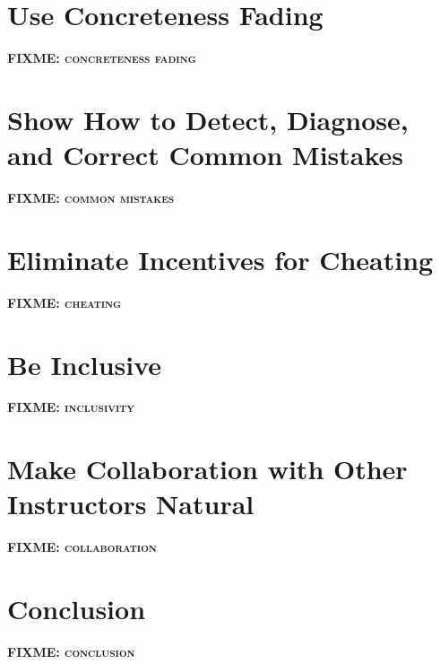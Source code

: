 \documentclass[10pt,letterpaper]{article}
\newcommand{\fixme}[1]{\textsc{\textbf{FIXME: {#1}}}}
\newcommand{\rulemajor}[1]{\section{#1}}
\begin{document}
\rulemajor{Use Concreteness Fading}

\fixme{concreteness fading}

\rulemajor{Show How to Detect, Diagnose, and Correct Common Mistakes}

\fixme{common mistakes}

\rulemajor{Eliminate Incentives for Cheating}

\fixme{cheating}

\rulemajor{Be Inclusive}

\fixme{inclusivity}

\rulemajor{Make Collaboration with Other Instructors Natural}

\fixme{collaboration}

\section*{Conclusion}

\fixme{conclusion}

\nocite{*} %

\end{document}
